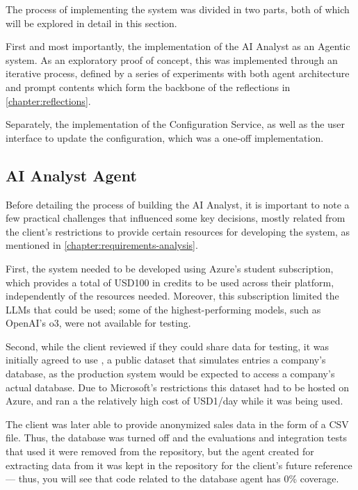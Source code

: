 \documentclass[a4paper]{report}
\begin{document}
The process of implementing the system was divided in two parts, both of which will be explored in detail in this section.

First and most importantly, the implementation of the AI Analyst as an Agentic system. As an exploratory proof of concept, this was implemented  through an iterative process, defined by a series of experiments with both agent architecture and prompt contents which form the backbone of the reflections in \autoref{chapter:reflections}.

Separately, the implementation of the Configuration Service, as well as the user interface to update the configuration, which was a one-off implementation.

\subsection{AI Analyst Agent}

Before detailing the process of building the AI Analyst, it is important to note a few practical challenges that influenced some key decisions, mostly related from the client's restrictions to provide certain resources for developing the system, as mentioned in \autoref{chapter:requirements-analysis}.

First, the system needed to be developed using Azure's student subscription, which provides a total of USD100 in credits to be used across their platform, independently of the resources needed. Moreover, this subscription limited the LLMs that could be used; some of the highest-performing models, such as OpenAI's o3, were not available for testing.

Second, while the client reviewed if they could share data for testing, it was initially agreed to use \cite{wideworldimporters2025}, a public dataset that simulates entries a company's database, as the production system would be expected to access a company's actual database. Due to Microsoft's restrictions this dataset had to be hosted on Azure, and ran a the relatively high cost of USD1/day while it was being used.

The client was later able to provide anonymized sales data in the form of a CSV file. Thus, the database was turned off and the evaluations and integration tests that used it were removed from the repository, but the agent created for extracting data from it was kept in the repository for the client's future reference --- thus, you will see that code related to the database agent has 0\% coverage. 
\end{document}
